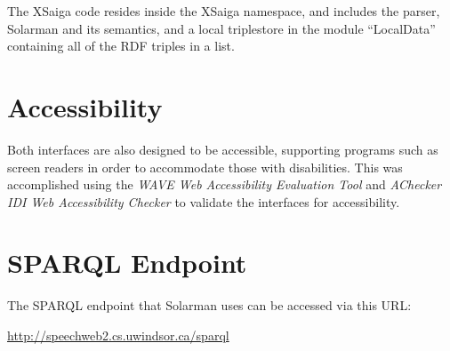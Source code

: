 \documentclass[../main.tex]{subfiles}
\begin{document}
The XSaiga code resides inside the XSaiga namespace, and includes the parser, Solarman and its semantics, and a local triplestore in the module ``LocalData'' containing
all of the RDF triples in a list.  

\section{Accessibility}

Both interfaces are also designed to be accessible, supporting programs such as screen readers in order to accommodate those with disabilities.
This was accomplished using the {\em WAVE Web Accessibility Evaluation Tool} \cite{wave} and {\em AChecker IDI Web Accessibility Checker} \cite{achecker} to validate the interfaces for accessibility.

\section{SPARQL Endpoint}
The SPARQL endpoint that Solarman uses can be accessed via this URL:

\url{http://speechweb2.cs.uwindsor.ca/sparql}
\end{document}
